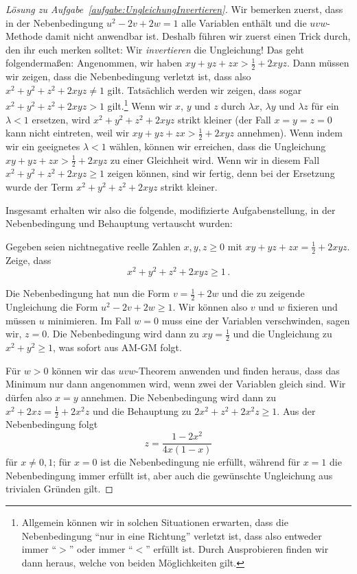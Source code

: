 \begin{proof}[Lösung zu Aufgabe~\ref{aufgabe:UngleichungInvertieren}]
	Wir bemerken zuerst, dass in der Nebenbedingung $u^2-2v+2w=1$ alle Variablen enthält und die $uvw$-Methode damit nicht anwendbar ist. Deshalb führen wir zuerst einen Trick durch, den ihr euch merken solltet: Wir \emph{invertieren} die Ungleichung! Das geht folgendermaßen: Angenommen, wir haben $xy+yz+zx>\frac12+2xyz$. Dann müssen wir zeigen, dass die Nebenbedingung verletzt ist, dass also $x^2+y^2+z^2+2xyz\neq 1$ gilt. Tatsächlich werden wir zeigen, dass sogar $x^2+y^2+z^2+2xyz>1$ gilt.\footnote{Allgemein können wir in solchen Situationen erwarten, dass die Nebenbedingung \enquote{nur in eine Richtung} verletzt ist, dass also entweder immer \enquote{$>$} oder immer \enquote{$<$} erfüllt ist. Durch Ausprobieren finden wir dann heraus, welche von beiden Möglichkeiten gilt.} Wenn wir $x$, $y$ und $z$ durch $\lambda x$, $\lambda y$ und $\lambda z$ für ein $\lambda <1$ ersetzen, wird $x^2+y^2+z^2+2xyz$ strikt kleiner (der Fall $x=y=z=0$ kann nicht eintreten, weil wir $xy+yz+zx>\frac12+2xyz$ annehmen). Wenn indem wir ein geeignetes $\lambda<1$ wählen, können wir erreichen, dass die Ungleichung $xy+yz+zx>\frac12+2xyz$ zu einer Gleichheit wird. Wenn wir in diesem Fall $x^2+y^2+z^2+2xyz\geqslant 1$ zeigen können, sind wir fertig, denn bei der Ersetzung wurde der Term $x^2+y^2+z^2+2xyz$ strikt kleiner.
	
	Insgesamt erhalten wir also die folgende, modifizierte Aufgabenstellung, in der Nebenbedingung und Behauptung vertauscht wurden:\addtocounter{caufgabe}{-1}
	\begin{aufgabe*}[$'$]
		Gegeben seien nichtnegative reelle Zahlen $x,y,z\geqslant 0$ mit $xy+yz+zx=\frac12+2xyz$. Zeige, dass
		\begin{equation*}
			x^2+y^2+z^2+2xyz\geqslant 1\,.
		\end{equation*}
	\end{aufgabe*}
	Die Nebenbedingung hat nun die Form $v=\frac12+2w$ und die zu zeigende Ungleichung die Form $u^2-2v+2w\geqslant 1$. Wir können also $v$ und $w$ fixieren und müssen $u$ minimieren. Im Fall $w=0$ muss eine der Variablen verschwinden, sagen wir, $z=0$. Die Nebenbedingung wird dann zu $xy=\frac12$ und die Ungleichung zu $x^2+y^2\geqslant 1$, was sofort aus AM-GM folgt.
	
	Für $w>0$ können wir das $uvw$-Theorem anwenden und finden heraus, dass das Minimum nur dann angenommen wird, wenn zwei der Variablen gleich sind. Wir dürfen also $x=y$ annehmen. Die Nebenbedingung wird dann zu $x^2+2xz=\frac12+2x^2z$ und die Behauptung zu $2x^2+z^2+2x^2z\geqslant 1$. Aus der Nebenbedingung folgt
	\begin{equation*}
		z=\frac{1-2x^2}{4x(1-x)}
	\end{equation*}
	für $x\neq 0,1$; für $x=0$ ist die Nebenbedingung nie erfüllt, während für $x=1$ die Nebenbedingung immer erfüllt ist, aber auch die gewünschte Ungleichung aus trivialen Gründen gilt.
	

\end{proof}
